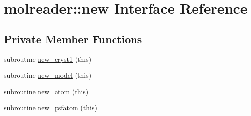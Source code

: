 \hypertarget{interfacemolreader_1_1new}{\section{molreader\-:\-:new Interface Reference}
\label{interfacemolreader_1_1new}
}
\subsection*{Private Member Functions}
\begin{DoxyCompactItemize}
\item 
subroutine \hyperlink{interfacemolreader_1_1new_ad81ee1b9d12963227f168d144524de7c}{new\-\_\-cryst1} (this)
\item 
subroutine \hyperlink{interfacemolreader_1_1new_ac306717f3be718d382c6b9c38ade70bb}{new\-\_\-model} (this)
\item 
subroutine \hyperlink{interfacemolreader_1_1new_a45405dac2693a9b5fbe3f6a62707395b}{new\-\_\-atom} (this)
\item 
subroutine \hyperlink{interfacemolreader_1_1new_a61dff60bac414a094a6a1082f3a63296}{new\-\_\-psfatom} (this)
\end{DoxyCompactItemize}


